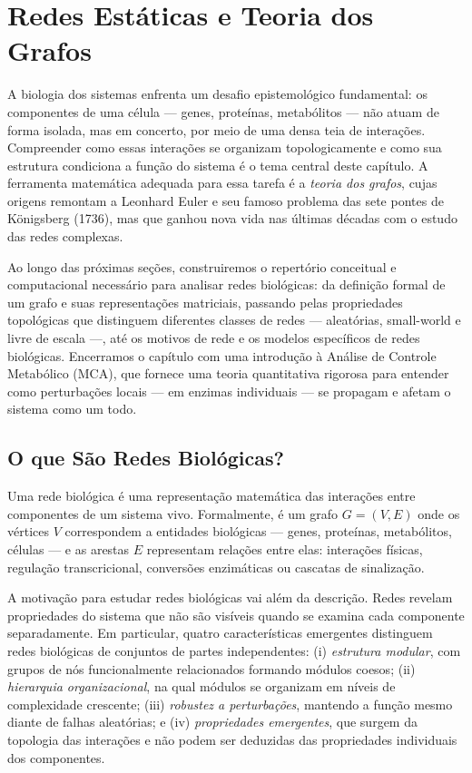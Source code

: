 \chapter{Redes Estáticas e Teoria dos Grafos}
\label{cap:03}

A biologia dos sistemas enfrenta um desafio epistemológico fundamental: os componentes de
uma célula — genes, proteínas, metabólitos — não atuam de forma isolada, mas em concerto,
por meio de uma densa teia de interações. Compreender como essas interações se organizam
topologicamente e como sua estrutura condiciona a função do sistema é o tema central deste
capítulo. A ferramenta matemática adequada para essa tarefa é a \emph{teoria dos grafos},
cujas origens remontam a Leonhard Euler e seu famoso problema das sete pontes de Königsberg
(1736), mas que ganhou nova vida nas últimas décadas com o estudo das redes complexas.

Ao longo das próximas seções, construiremos o repertório conceitual e computacional
necessário para analisar redes biológicas: da definição formal de um grafo e suas
representações matriciais, passando pelas propriedades topológicas que distinguem diferentes
classes de redes — aleatórias, small-world e livre de escala —, até os motivos de rede
e os modelos específicos de redes biológicas. Encerramos o capítulo com uma introdução à
Análise de Controle Metabólico (MCA), que fornece uma teoria quantitativa rigorosa para
entender como perturbações locais — em enzimas individuais — se propagam e afetam o sistema
como um todo.

\section{O que São Redes Biológicas?}

\begin{definicaoenv}
Uma rede biológica é uma representação matemática das interações entre componentes de um
sistema vivo. Formalmente, é um grafo $G = (V, E)$ onde os vértices $V$ correspondem a
entidades biológicas — genes, proteínas, metabólitos, células — e as arestas $E$ representam
relações entre elas: interações físicas, regulação transcricional, conversões enzimáticas ou
cascatas de sinalização.
\end{definicaoenv}

A motivação para estudar redes biológicas vai além da descrição. Redes revelam propriedades
do sistema que não são visíveis quando se examina cada componente separadamente. Em
particular, quatro características emergentes distinguem redes biológicas de conjuntos de
partes independentes: (i) \emph{estrutura modular}, com grupos de nós funcionalmente
relacionados formando módulos coesos; (ii) \emph{hierarquia organizacional}, na qual módulos
se organizam em níveis de complexidade crescente; (iii) \emph{robustez a perturbações},
mantendo a função mesmo diante de falhas aleatórias; e (iv) \emph{propriedades emergentes},
que surgem da topologia das interações e não podem ser deduzidas das propriedades individuais
dos componentes.

